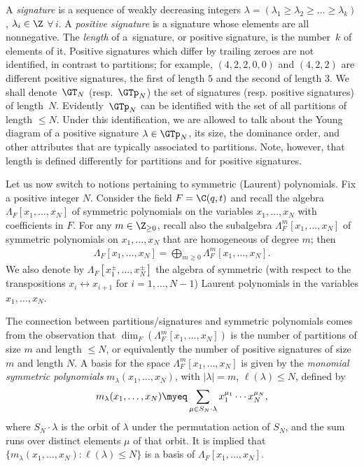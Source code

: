 A \textit{signature} is a sequence of weakly decreasing integers $\lambda = (\lambda_1 \geq \lambda_2 \geq \dots\geq \lambda_k)$, $\lambda_i\in\Z$ $\forall\, i$. A \textit{positive signature} is a signature whose elements are all nonnegative. The \textit{length} of a~signature, or positive signature, is the number~$k$ of elements of it. Positive signatures which dif\/fer by trailing zeroes are not identif\/ied, in contrast to partitions; for example, $(4, 2, 2, 0, 0)$ and $(4, 2, 2)$ are dif\/ferent positive signatures, the f\/irst of length $5$ and the second of length $3$. We shall denote~$\GT_N$ (resp.~$\GTp_N$) the set of signatures (resp. positive signatures) of length~$N$. Evidently~$\GTp_N$ can be identif\/ied with the set of all partitions of length $\leq N$. Under this identif\/ication, we are allowed to talk about the Young diagram of a positive signature $\lambda\in\GTp_N$, its size, the dominance order, and other attributes that are typically associated to partitions. Note, however, that length is def\/ined dif\/ferently for partitions and for positive signatures.

Let us now switch to notions pertaining to symmetric (Laurent) polynomials. Fix a positive integer $N$. Consider the f\/ield $F = \C(q, t)$ and recall the algebra $\Lambda_F[x_1, \dots, x_N]$ of symmetric polynomials on the variables $x_1, \dots, x_N$ with coef\/f\/icients in $F$. For any $m\in\Z_{\geq 0}$, recall also the subalgebra $\Lambda_F^m[x_1, \dots, x_N]$ of symmetric polynomials on $x_1, \dots, x_N$ that are homogeneous of degree $m$; then
\begin{gather*}
\Lambda_F[x_1, \dots, x_N] = \bigoplus_{m\geq 0}{\Lambda_F^m[x_1, \dots, x_N]}.
\end{gather*}
We also denote by $\Lambda_F[x_1^{\pm}, \dots, x_N^{\pm}]$ the algebra of symmetric (with respect to the transpositions $x_i \leftrightarrow x_{i+1}$ for $i = 1, \dots, N-1$) Laurent polynomials in the variables $x_1, \dots, x_N$.

The connection between partitions/signatures and symmetric polynomials comes from the observation that $\dim_F \left(\Lambda_F^m[x_1, \dots, x_N]\right)$ is the number of partitions of size $m$ and length $\leq N$, or equivalently the number of positive signatures of size $m$ and length $N$. A basis for the space $\Lambda_F^m[x_1, \dots, x_N]$ is given by the \textit{monomial symmetric polynomials} $m_{\lambda}(x_1, \dots, x_N)$, with $|\lambda| = m$, $\ell(\lambda)\leq N$, def\/ined by
\begin{gather*}
m_{\lambda}(x_1, \dots, x_N) \myeq \sum_{\mu\in S_N\cdot\lambda}{x_1^{\mu_1}\cdots x_N^{\mu_N}},
\end{gather*}
where $S_N\cdot\lambda$ is the orbit of $\lambda$ under the permutation action of $S_N$, and the sum runs over distinct elements $\mu$ of that orbit. It is implied that $\{m_{\lambda}(x_1, \dots, x_N)\colon \ell(\lambda) \leq N\}$ is a basis of $\Lambda_F[x_1, \dots, x_N]$.

